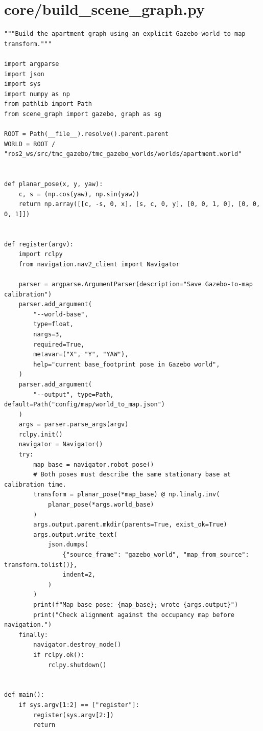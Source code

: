 \documentclass[11pt,a4paper]{book}
\begin{document}
\section{core/build\_scene\_graph.py}
\begin{lstlisting}
"""Build the apartment graph using an explicit Gazebo-world-to-map transform."""

import argparse
import json
import sys
import numpy as np
from pathlib import Path
from scene_graph import gazebo, graph as sg

ROOT = Path(__file__).resolve().parent.parent
WORLD = ROOT / "ros2_ws/src/tmc_gazebo/tmc_gazebo_worlds/worlds/apartment.world"


def planar_pose(x, y, yaw):
    c, s = (np.cos(yaw), np.sin(yaw))
    return np.array([[c, -s, 0, x], [s, c, 0, y], [0, 0, 1, 0], [0, 0, 0, 1]])


def register(argv):
    import rclpy
    from navigation.nav2_client import Navigator

    parser = argparse.ArgumentParser(description="Save Gazebo-to-map calibration")
    parser.add_argument(
        "--world-base",
        type=float,
        nargs=3,
        required=True,
        metavar=("X", "Y", "YAW"),
        help="current base_footprint pose in Gazebo world",
    )
    parser.add_argument(
        "--output", type=Path, default=Path("config/map/world_to_map.json")
    )
    args = parser.parse_args(argv)
    rclpy.init()
    navigator = Navigator()
    try:
        map_base = navigator.robot_pose()
        # Both poses must describe the same stationary base at calibration time.
        transform = planar_pose(*map_base) @ np.linalg.inv(
            planar_pose(*args.world_base)
        )
        args.output.parent.mkdir(parents=True, exist_ok=True)
        args.output.write_text(
            json.dumps(
                {"source_frame": "gazebo_world", "map_from_source": transform.tolist()},
                indent=2,
            )
        )
        print(f"Map base pose: {map_base}; wrote {args.output}")
        print("Check alignment against the occupancy map before navigation.")
    finally:
        navigator.destroy_node()
        if rclpy.ok():
            rclpy.shutdown()


def main():
    if sys.argv[1:2] == ["register"]:
        register(sys.argv[2:])
        return


\end{lstlisting}
\end{document}
